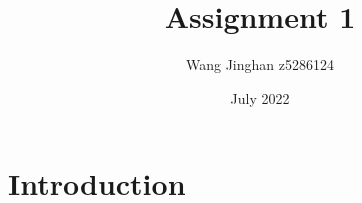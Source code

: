 \documentclass{article}
\title{Assignment 1}
\author{Wang Jinghan z5286124}
\date{July 2022}
\begin{document}
\maketitle

\section{Introduction}
\end{document}
